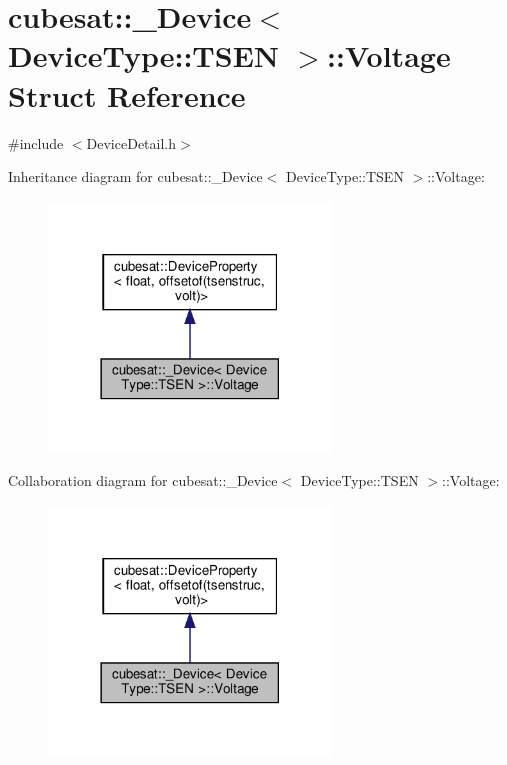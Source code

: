 \hypertarget{structcubesat_1_1__Device_3_01DeviceType_1_1TSEN_01_4_1_1Voltage}{}\section{cubesat\+:\+:\+\_\+\+Device$<$ Device\+Type\+:\+:T\+S\+EN $>$\+:\+:Voltage Struct Reference}
\label{structcubesat_1_1__Device_3_01DeviceType_1_1TSEN_01_4_1_1Voltage}


{\ttfamily \#include $<$Device\+Detail.\+h$>$}



Inheritance diagram for cubesat\+:\+:\+\_\+\+Device$<$ Device\+Type\+:\+:T\+S\+EN $>$\+:\+:Voltage\+:\nopagebreak
\begin{figure}[H]
\begin{center}
\leavevmode
\includegraphics[width=213pt]{structcubesat_1_1__Device_3_01DeviceType_1_1TSEN_01_4_1_1Voltage__inherit__graph}
\end{center}
\end{figure}


Collaboration diagram for cubesat\+:\+:\+\_\+\+Device$<$ Device\+Type\+:\+:T\+S\+EN $>$\+:\+:Voltage\+:\nopagebreak
\begin{figure}[H]
\begin{center}
\leavevmode
\includegraphics[width=213pt]{structcubesat_1_1__Device_3_01DeviceType_1_1TSEN_01_4_1_1Voltage__coll__graph}
\end{center}
\end{figure}
